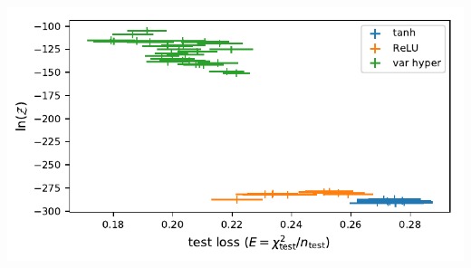 \documentclass[%
]{beamer}
\begin{document}
\begin{frame}
\begin{columns}
\begin{column}{0.4\textwidth}
            \includegraphics[width=\textwidth]{./figures/non_comb_mean_results_colour.pdf}
        \end{column}
    \end{columns}
\end{frame}
\end{document}
